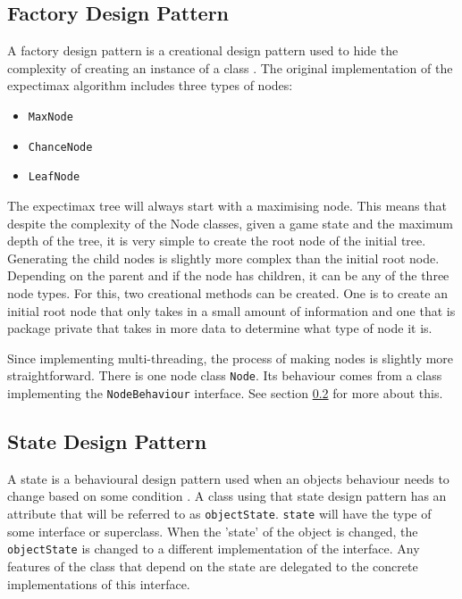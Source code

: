 \documentclass{article}
\begin{document}
\subsection{Factory Design Pattern}
\label{subsec:factory}
A factory design pattern is a creational design pattern used to hide the complexity of creating an instance of a class \cite{CS2800_creational}. The original implementation of the expectimax algorithm includes three types of nodes:
\begin{itemize}
    \item \texttt{MaxNode}
    \item \texttt{ChanceNode}
    \item \texttt{LeafNode}
\end{itemize}
The  expectimax tree will always start with a maximising node. This means that despite the complexity of the Node classes, given a game state and the maximum depth of the tree, it is very simple to create the root node of the initial tree. Generating the child nodes is slightly more complex than the initial root node. Depending on the parent and if the node has children, it can be any of the three node types. For this, two creational methods can be created. One is to create an initial root node that only takes in a small amount of information and one that is package private that takes in more data to determine what type of node it is.

Since implementing multi-threading, the process of making nodes is slightly more straightforward. There is one node class \texttt{Node}. Its behaviour comes from a class implementing the \texttt{NodeBehaviour} interface. See section \ref{subsec:state} for more about this.


\subsection{State Design Pattern}
\label{subsec:state}
A state is a behavioural design pattern used when an object\textquotesingle s behaviour needs to change based on some condition \cite{CS2800_behavioural}. A class using that state design pattern has an attribute that will be referred to as \texttt{objectState}. \texttt{state} will have the type of some interface or superclass. When the 'state' of the object is changed, the \texttt{objectState} is changed to a different implementation of the interface. Any features of the class that depend on the state are delegated to the concrete implementations of this interface.
\end{document}
